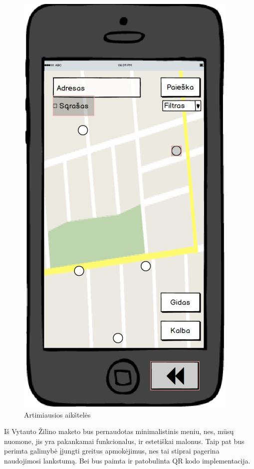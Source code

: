 \documentclass{VUMIFPSkursinis}
\begin{document}
\begin{figure}[H]
    \centering
    \includegraphics[scale=0.5]{img/mig3}
	\caption{Artimiausios aikštelės \label{fig:mig3}}
\end{figure}

Iš Vytauto Žilino maketo bus pernaudotas minimalistinis meniu, nes, mūsų nuomone, jis yra pakankamai funkcionalus, ir estetiškai malonus. Taip pat bus perimta galimybė įjungti greitus apmokėjimus, nes tai stiprai pagerina naudojimosi lankstumą. Bei bus paimta ir patobulinta QR kodo implementacija.
\end{document}
